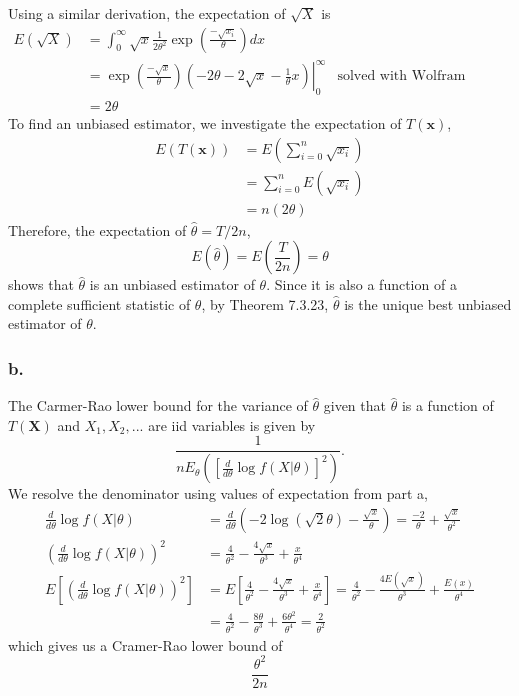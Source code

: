 \documentclass{article}
\begin{document}
Using a similar derivation, the expectation of $\sqrt{X}$ is
\begin{align*}
E(\sqrt{X}) &= \int_0^\infty \sqrt{x}\frac{1}{2\theta^2}\exp{\left(\frac{-\sqrt{x_i}}{\theta}\right)} dx \\
&=\left.\exp{\left(\frac{-\sqrt{x}}{\theta}\right)}\left(-2\theta-2\sqrt{x}-\frac{1}{\theta}x\right)\right|_0^\infty &\text{solved with Wolfram Alpha} \\
&=2\theta
\end{align*}
To find an unbiased estimator, we investigate the expectation of $T(\mathbf{x})$,
\begin{align*}
E\left(T(\mathbf{x})\right) &= E\left(\sum_{i=0}^n\sqrt{x_i}\right) \\
&=\sum_{i=0}^n E\left(\sqrt{x_i}\right) \\
&=n(2\theta)
\end{align*}
Therefore, the expectation of $\hat{\theta} = T/2n$, \[E(\hat{\theta}) = E\left(\frac{T}{2n}\right) = \theta\] shows that $\hat{\theta}$ is an unbiased estimator of $\theta$. Since it is also a function of a complete sufficient statistic of $\theta$, by Theorem 7.3.23, $\hat{\theta}$ is the unique best unbiased estimator of $\theta$.

\subsubsection*{b.}
The Carmer-Rao lower bound for the variance of $\hat{\theta}$ given that $\hat{\theta}$ is a function of $T(\mathbf{X})$ and $X_1, X_2, ...$ are iid variables is given by 
\[\frac{1}{nE_\theta\left(\left[\frac{d}{d\theta}\log f(X|\theta)\right]^2\right)}.\]
We resolve the denominator using values of expectation from part a, 
\begin{align*}
\frac{d}{d\theta}\log f(X|\theta) &= \frac{d}{d\theta}\left(-2\log(\sqrt{2}\theta)-\frac{\sqrt{x}}{\theta}\right) = \frac{-2}{\theta}+\frac{\sqrt{x}}{\theta^2} \\
\left(\frac{d}{d\theta}\log f(X|\theta)\right)^2 &= \frac{4}{\theta^2}-\frac{4\sqrt{x}}{\theta^3}+\frac{x}{\theta^4} \\
E\left[\left(\frac{d}{d\theta}\log f(X|\theta)\right)^2\right] &= E\left[\frac{4}{\theta^2}-\frac{4\sqrt{x}}{\theta^3}+\frac{x}{\theta^4}\right] = \frac{4}{\theta^2}-\frac{4E(\sqrt{x})}{\theta^3}+\frac{E(x)}{\theta^4} \\
&=\frac{4}{\theta^2} - \frac{8\theta}{\theta^3}+\frac{6\theta^2}{\theta^4} = \frac{2}{\theta^2}
\end{align*}
which gives us a Cramer-Rao lower bound of 
\[\frac{\theta^2}{2n}\]
\end{document}
